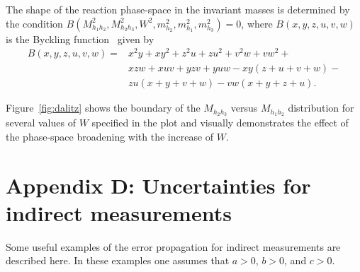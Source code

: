 The shape of the reaction phase-space in the invariant masses is determined by the condition $B(M_{h_{1}h_{2}}^{2}, M_{h_{2}h_{3}}^{2}, W^{2}, m_{h_{2}}^{2}, m_{h_{1}}^{2}, m_{h_{3}}^{2}) = 0$, where $B(x, y, z, u, v, w)$ is the Byckling function~\cite{Byckling:1971vca} given by 
\begin{equation}
\begin{split}
B(x,y,z,u,v,w) = &x^{2}y+xy^{2}+z^{2}u+zu^{2}+v^{2}w+vw^{2}+ \\   
&xzw+xuv+yzv+yuw- xy(z+u+v+w)- \\ 
&zu(x+y+v+w)-vw(x+y+z+u).
\label{eq:byckling}
\end{split}
\end{equation}

Figure~\ref{fig:dalitz} shows the boundary of the $M_{h_{2}h_{3}}$ versus $M_{h_{1}h_{2}}$ distribution for several values of $W$ specified in the plot and visually demonstrates the effect  of the phase-space broadening with the increase of $W$.



\renewcommand{\thesection}{D}
    \makeatletter
   \renewcommand{\theequation}{\thesection.\@arabic\c@equation}
    \makeatother
\section*{Appendix D: Uncertainties for indirect measurements}
\label{app_uncert}



Some useful examples of the error propagation for indirect measurements are described here. In these examples one assumes that $a>0$, $b>0$, and $c>0$.



